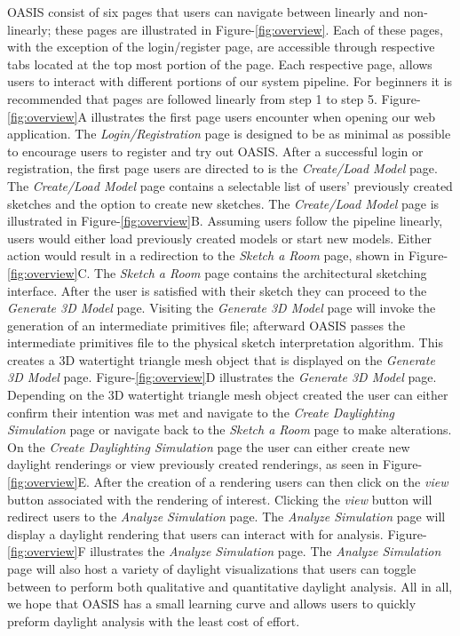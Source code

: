OASIS consist of six pages that users can navigate between linearly and non-linearly; these pages are illustrated in Figure-\ref{fig:overview}.
Each of these pages, with the exception of the login/register page, are accessible through respective tabs located at the top most portion of the page.
Each respective page, allows users to interact with different portions of our system pipeline.
For beginners it is recommended that pages are followed linearly from step 1 to step 5.
Figure-\ref{fig:overview}A illustrates the first page users encounter when opening our web application.
The \textit{Login/Registration} page is designed to be as minimal as possible to encourage users to register and try out OASIS.
After a successful login or registration, the first page users are directed to is the \textit{Create/Load Model} page.
The \textit{Create/Load Model} page contains a selectable list of users' previously created sketches and the option to create new sketches.
The \textit{Create/Load Model} page is illustrated in Figure-\ref{fig:overview}B.
Assuming users follow the pipeline linearly, users would either load previously created models or start new models.
Either action would result in a redirection to the \textit{Sketch a Room} page, shown in Figure-\ref{fig:overview}C.
The \textit{Sketch a Room} page contains the architectural sketching interface.
After the user is satisfied with their sketch they can proceed to the \textit{Generate 3D Model} page.
Visiting the \textit{Generate 3D Model} page will invoke the generation of an intermediate primitives file; afterward OASIS passes the intermediate primitives file to the physical sketch interpretation algorithm. This creates a 3D watertight triangle mesh object that is displayed on the \textit{Generate 3D Model} page.
Figure-\ref{fig:overview}D illustrates the \textit{Generate 3D Model} page.
Depending on the 3D watertight triangle mesh object created the user can either confirm their intention was met and navigate to the \textit{Create Daylighting Simulation} page or navigate back to the \textit{Sketch a Room} page to make alterations.
On the \textit{Create Daylighting Simulation} page the user can either create new daylight renderings or view previously created renderings, as seen in Figure-\ref{fig:overview}E.
After the creation of a rendering users can then click on the \textit{view} button associated with the rendering of interest.
Clicking the \textit{view} button will redirect users to the \textit{Analyze Simulation} page.
The \textit{Analyze Simulation} page will display a daylight rendering that users can interact with for analysis.
Figure-\ref{fig:overview}F illustrates the \textit{Analyze Simulation} page.
The \textit{Analyze Simulation} page will also host a variety of daylight visualizations that users can toggle between to perform both qualitative and quantitative daylight analysis.
All in all, we hope that OASIS has a small learning curve and allows users to quickly preform daylight analysis with the least cost of effort.


